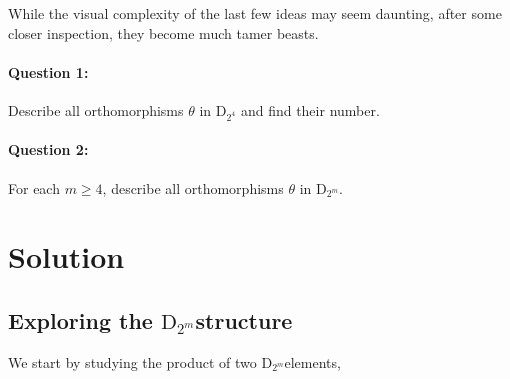 \documentclass[11pt]{llncs}
\newcommand{\dm}[0]{$\text{D}_{2^m}$\hspace{0.7mm}}
\newcommand{\dM}[1]{$\text{D}_{2^{#1}}$\hspace{0.7mm}}
\begin{document}
While the visual complexity of the last few ideas may seem daunting, after some closer inspection, they become much tamer beasts.

\paragraph{\textbf{Question 1:}} Describe all orthomorphisms $\theta$ in \dM{4} and find their number.

\paragraph{\textbf{Question 2:}} For each $m \geq 4$, describe all orthomorphisms $\theta$ in \dm.

\section{Solution}

\subsection{Exploring the \dm structure}

We start by studying the product of two \dm elements, 
\end{document}
